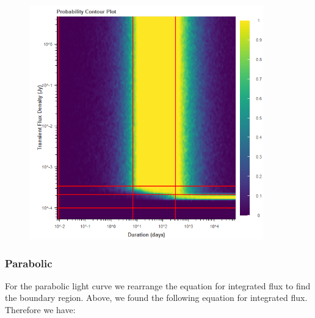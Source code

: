 \documentclass{article}
\begin{document}
\begin{figure}[H] 
	\begin{center}
		\includegraphics[width=4in]{output_tophat_ProbContour.png}
		
		\label{tophat}
	\end{center}
\end{figure}
\subsubsection{Parabolic}
For the parabolic light curve we rearrange the equation for integrated flux to find the boundary region. Above, we found the following equation for integrated flux. Therefore we have:
\end{document}
